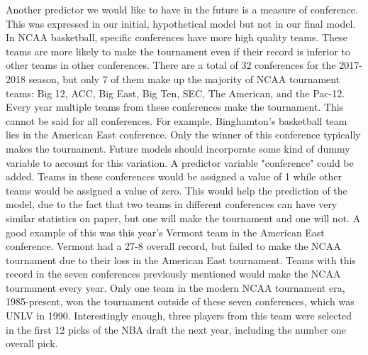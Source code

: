 \documentclass[]{scrartcl}
\begin{document}
Another predictor we would like to have in the future is a measure of conference. This was expressed in our initial, hypothetical model but not in our final model. In NCAA basketball, specific conferences have more high quality teams. These teams are more likely to make the tournament even if their record is inferior to other teams in other conferences. There are a total of 32 conferences for the 2017-2018 season, but only 7 of them make up the majority of NCAA tournament teams: Big 12, ACC, Big East, Big Ten, SEC, The American, and the Pac-12. Every  year multiple teams from these conferences make the tournament. This cannot be said for all conferences. For example, Binghamton's basketball team lies in the American East conference. Only the winner of this conference typically makes the tournament. Future models should incorporate some kind of dummy variable to account for this variation. A predictor variable "conference" could be added. Teams in these conferences would be assigned a value of 1 while other teams would be assigned a value of zero. This would help the prediction of the model, due to the fact that two teams in different conferences can have very similar statistics on paper, but one will make the tournament and one will not. A good example of this was this year's Vermont team in the American East conference. Vermont had a 27-8 overall record, but failed to make the NCAA tournament due to their loss in the American East tournament. Teams with this record in the seven conferences previously mentioned would make the NCAA tournament every year. Only one team in the modern NCAA tournament era, 1985-present, won the tournament outside of these seven conferences, which was UNLV in 1990. Interestingly enough, three players from this team were selected in the first 12 picks of the NBA draft the next year, including the number one overall pick.   
\end{document}
